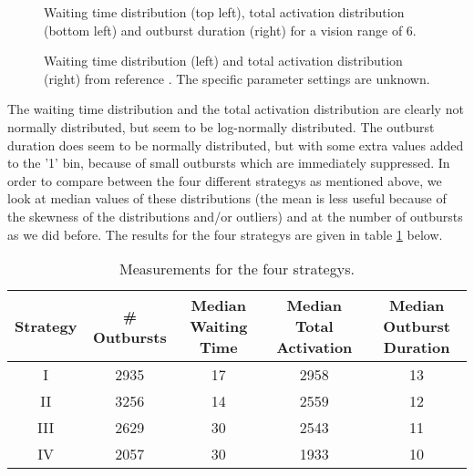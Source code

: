 \documentclass[11pt,a4paper,onecolumn]{article}
\begin{document}
\begin{figure}[H]
  \centering
  \caption{Waiting time distribution (top left), total activation distribution (bottom left) and outburst duration (right) for a vision range of 6.}
  \label{fig:dist}
\end{figure}


\begin{figure}[H]
  \centering
  \caption{Waiting time distribution (left) and total activation distribution (right) from reference \cite{Epstein}. The specific parameter settings are unknown.}
  \label{fig:Epstein}
\end{figure}

The waiting time distribution and the total activation distribution are clearly not normally distributed, but seem to be log-normally distributed. The outburst duration does seem to be normally distributed, but with some extra values added to the '1' bin, because of small outbursts which are immediately suppressed. In order to compare between the four different strategys as mentioned above, we look at median values of these distributions (the mean is less useful because of the skewness of the distributions and/or outliers) and at the number of outbursts as we did before. The results for the four strategys are given in table \ref{tab:results} below.

\begin{table}[H]
  \centering
  \begin{tabular}{c | c | c | c | c}
    Strategy & \# Outbursts & Median Waiting Time & Median Total Activation & Median Outburst Duration \\
    \hline
    I & 2935 & 17 & 2958 & 13 \\
    II & 3256 & 14 & 2559 & 12 \\
    III & 2629 & 30 & 2543 & 11 \\
    IV & 2057 & 30 & 1933 & 10
  \end{tabular}
  \caption{Measurements for the four strategys.}
  \label{tab:results}
\end{table}
\end{document}
